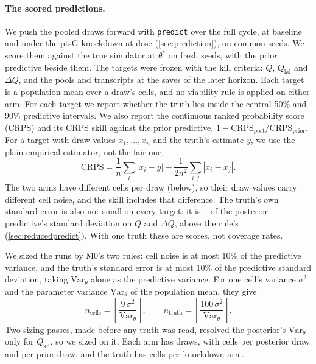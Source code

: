 \paragraph{The scored predictions.} We push the pooled draws forward with \texttt{predict}
over the full cycle, at baseline and under the ptsG knockdown at dose 
(\cref{sec:prediction}), on common seeds. We score them against the true simulator at
$\theta^\ast$ on fresh seeds, with the prior predictive beside them. The targets were frozen
with the kill criteria: $Q$, $Q_{\mathrm{kd}}$ and $\Delta Q$, and the  pools and 
transcripts at the  saves of the later horizon. Each target is a
population mean over a draw's cells, and no viability rule is applied on either arm. For
each target we report whether the truth lies inside the central 50\% and 90\% predictive
intervals. We also report the continuous ranked probability score (CRPS) \cite{gneiting2007strictly} and its CRPS skill against the prior predictive,
$1 - \mathrm{CRPS}_{\mathrm{post}} / \mathrm{CRPS}_{\mathrm{prior}}$. For a target with
draw values $x_1, \dots, x_n$ and the truth's estimate $y$, we use the plain empirical
estimator, not the fair one,
\begin{equation*}
  \mathrm{CRPS} = \frac{1}{n} \sum_{i} |x_i - y| - \frac{1}{2n^2} \sum_{i,j} |x_i - x_j| .
\end{equation*}
The two arms have different cells per draw (below), so their draw values carry different
cell noise, and the skill includes that difference. The truth's own standard error is
also not small on every target: it is -- of the posterior
predictive's standard deviation on $Q$ and $\Delta Q$, above the rule's 
(\cref{sec:reducedpredict}). With one truth these are scores, not coverage rates.

We sized the runs by M0's two rules: cell noise is at most 10\% of the predictive
variance, and the truth's standard error is at most 10\% of the predictive standard
deviation, taking $\mathrm{Var}_\theta$ alone as the predictive variance. For one cell's
variance $\sigma^2$ and the parameter variance $\mathrm{Var}_\theta$ of the population
mean, they give
\begin{equation}
  n_{\mathrm{cells}} = \left\lceil \frac{9\,\sigma^2}{\mathrm{Var}_\theta} \right\rceil ,
  \qquad
  n_{\mathrm{truth}} = \left\lceil \frac{100\,\sigma^2}{\mathrm{Var}_\theta} \right\rceil .
\end{equation}
Two sizing passes, made before any truth was read, resolved the posterior's
$\mathrm{Var}_\theta$ only for $Q_{\mathrm{kd}}$, so we sized on it. Each arm has
 draws, with  cells per posterior draw and
 per prior draw, and the truth has  cells per
knockdown arm.

